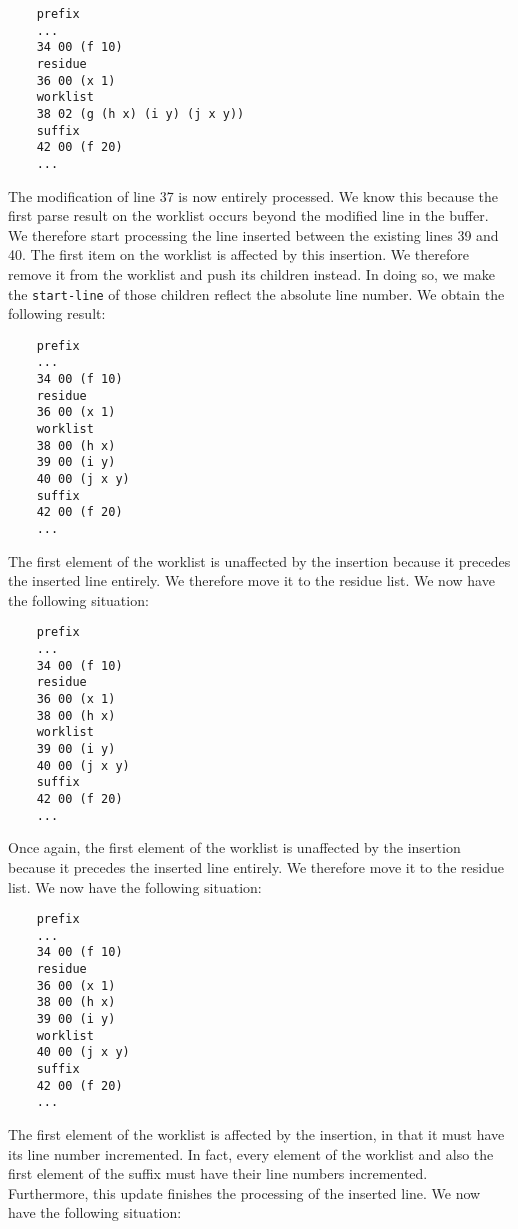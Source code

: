 {\small\begin{verbatim}
    prefix
    ...
    34 00 (f 10)
    residue
    36 00 (x 1)
    worklist
    38 02 (g (h x) (i y) (j x y))
    suffix
    42 00 (f 20)
    ...
\end{verbatim}}

The modification of line 37 is now entirely processed.  We know this
because the first parse result on the worklist occurs beyond the
modified line in the buffer.  We therefore start processing the line
inserted between the existing lines 39 and 40.  The first item on the
worklist is affected by this insertion.  We therefore remove it from
the worklist and push its children instead.  In doing so, we make the
\texttt{start-line} of those children reflect the absolute line
number.  We obtain the following result:

{\small\begin{verbatim}
    prefix
    ...
    34 00 (f 10)
    residue
    36 00 (x 1)
    worklist
    38 00 (h x)
    39 00 (i y)
    40 00 (j x y)
    suffix
    42 00 (f 20)
    ...
\end{verbatim}}

The first element of the worklist is unaffected by the insertion
because it precedes the inserted line entirely.  We therefore move it
to the residue list.  We now have the following situation:

{\small\begin{verbatim}
    prefix
    ...
    34 00 (f 10)
    residue
    36 00 (x 1)
    38 00 (h x)
    worklist
    39 00 (i y)
    40 00 (j x y)
    suffix
    42 00 (f 20)
    ...
\end{verbatim}}

Once again, the first element of the worklist is unaffected by the
insertion because it precedes the inserted line entirely.  We
therefore move it to the residue list.  We now have the following
situation:

{\small\begin{verbatim}
    prefix
    ...
    34 00 (f 10)
    residue
    36 00 (x 1)
    38 00 (h x)
    39 00 (i y)
    worklist
    40 00 (j x y)
    suffix
    42 00 (f 20)
    ...
\end{verbatim}}

The first element of the worklist is affected by the insertion, in
that it must have its line number incremented.  In fact, every element
of the worklist and also the first element of the suffix must have
their line numbers incremented.  Furthermore, this update finishes the
processing of the inserted line.  We now have the following situation:

